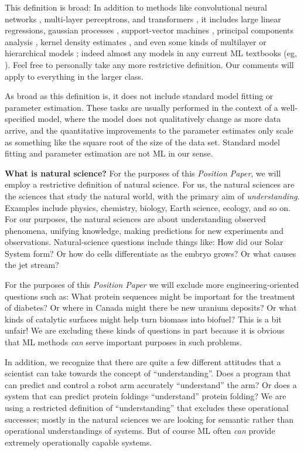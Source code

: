 \documentclass{article}
\newcommand{\documentname}{\textsl{Position Paper}}
\renewcommand{\paragraph}[1]{\noindent\par\textbf{#1}}
\begin{document}
This definition is broad:
In addition to methods like convolutional neural networks \cite{cnn}, multi-layer perceptrons, and transformers \cite{transformer}, it includes large linear regressions, gaussian processes \cite{gp}, support-vector machines \cite{svm}, principal components analysis \cite{pca}, kernel density estimates \cite{kde}, and even some kinds of multilayer or hierarchical models \cite{multilevel}; indeed almost any models in any current ML textbooks (eg, \citealt{ml_book1, ml_book2}).
Feel free to personally take any more restrictive definition.
Our comments will apply to everything in the larger class.

As broad as this definition is, it does not include standard model fitting or parameter estimation.
These tasks are usually performed in the context of a well-specified model, where the model does not qualitatively change as more data arrive, and the quantitative improvements to the parameter estimates only scale as something like the square root of the size of the data set.
Standard model fitting and parameter estimation are not ML in our sense.

\paragraph{What is natural science?}
For the purposes of this \documentname, we will employ a restrictive definition of natural science.
For us, the natural sciences are the sciences that study the natural world, with the primary aim of \emph{understanding}.
Examples include physics, chemistry, biology, Earth science, ecology, and so on.
For our purposes, the natural sciences are about understanding observed phenomena, unifying knowledge, making predictions for new experiments and observations.
Natural-science questions include things like: How did our Solar System form? Or how do cells differentiate as the embryo grows? Or what causes the jet stream?

For the purposes of this \documentname{} we will exclude more engineering-oriented questions such as: What protein sequences might be important for the treatment of diabetes? Or where in Canada might there be new uranium deposits? Or what kinds of catalytic surfaces might help turn biomass into biofuel?
This is a bit unfair!
We are excluding these kinds of questions in part because it is obvious that ML methods \emph{can} serve important purposes in such problems.

In addition, we recognize that there are quite a few different attitudes that a scientist can take towards the concept of ``understanding''.
Does a program that can predict and control a robot arm accurately ``understand'' the arm?
Or does a system that can predict protein foldings ``understand'' protein folding?
We are using a restricted definition of ``understanding'' that excludes these operational successes; mostly in the natural sciences we are looking for semantic rather than operational understandings of systems.
But of course ML often \emph{can} provide extremely operationally capable systems.
\end{document}

